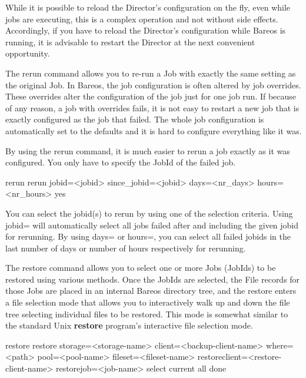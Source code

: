 \begin{description}
   While it is possible to reload the Director's configuration on the fly,
   even while jobs are executing, this is a complex operation and not
   without side effects.  Accordingly, if you have to reload the Director's
   configuration while Bareos is running, it is advisable to restart the
   Director at the next convenient opportunity.

\item [rerun]
   The rerun command allows you to re-run a Job with exactly the same setting
   as the original Job. In Bareos, the job configuration is often altered by job
   overrides. These overrides alter the configuration of the job just for one job run.
   If because of any reason, a job with overrides fails, it is not easy to restart
   a new job that is exactly configured as the job that failed. The whole job
   configuration is automatically set to the defaults and it is hard to
   configure everything like it was.

   By using the rerun command, it is much easier to rerun a job exactly
   as it was configured. You only have to specify the JobId of the failed job.

\begin{bconsole}{rerun}
rerun jobid=<jobid> since_jobid=<jobid> days=<nr_days> hours=<nr_hours> yes
\end{bconsole}

   You can select the jobid(s) to rerun by using one of the selection criteria. Using jobid= will automatically select all jobs failed after and including the given jobid for rerunning. By using days= or hours=, you can select all failed jobids in the last number of days or number of hours respectively for rerunning.

\item [restore]
   \label{bcommandRestore}
   The restore command allows you to select one or more Jobs (JobIds) to be
   restored using various methods.  Once the JobIds are selected, the File
   records for those Jobs are placed in an internal Bareos directory tree,
   and the restore enters a file selection mode that allows you to
   interactively walk up and down the file tree selecting individual files
   to be restored.  This mode is somewhat similar to the standard Unix {\bf
   restore} program's interactive file selection mode.

\begin{bconsole}{restore}
restore storage=<storage-name> client=<backup-client-name>
  where=<path> pool=<pool-name> fileset=<fileset-name>
  restoreclient=<restore-client-name>
  restorejob=<job-name>
  select current all done
\end{bconsole}


\end{description}
